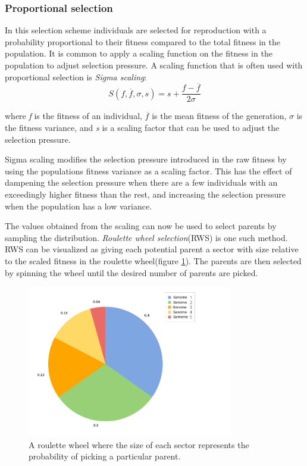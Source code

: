 		\subsubsection{Proportional selection}
		In this selection scheme individuals are selected for reproduction with a probability proportional to their fitness compared to the total fitness in the population.
		It is common to apply a scaling function on the fitness in the population to adjust selection pressure.
		A scaling function that is often used with proportional selection is \emph{Sigma scaling}\cite{goh_sexual_2003}:
		\begin{equation}
		S(f, \overline{f}, \sigma, s) = s + \frac{f - \overline{f} }{2\sigma}
		\end{equation}
		
		where \emph{f} is the fitness of an individual, $\overline{f}$ is the mean fitness of the generation, $\sigma$ is the fitness variance, and \emph{s} is a scaling factor that can be used to adjust the selection pressure.
		
		Sigma scaling modifies the selection pressure introduced in the raw fitness by using the populations fitness variance as a scaling factor.
		This has the effect of dampening the selection pressure when there are a few individuals with an exceedingly higher fitness than the rest, and increasing the selection pressure when the population has a low variance.
		
		The values obtained from the scaling can now be used to select parents by sampling the distribution.
		\emph{Roulette wheel selection}(RWS)\cite{goh_sexual_2003}  is one such method.
		RWS can be visualized as giving each potential parent a sector with size relative to the scaled fitness in the roulette wheel(figure \ref{fig:roulette}).
		The parents are then selected by spinning the wheel until the desired number of parents are picked.
		
		\begin{figure}[H]
			
			\centering
			\includegraphics[width=0.80\textwidth, clip]{chapters/res/roulette.png}
			\caption{A roulette wheel where the size of each sector represents the probability of picking a particular parent.}
			\label{fig:roulette}
		\end{figure}
		

